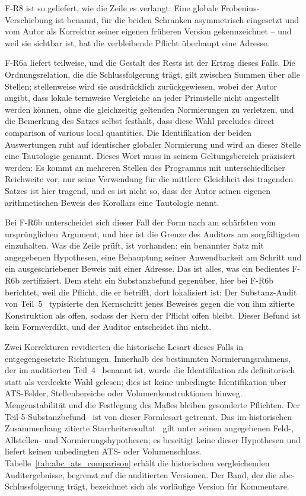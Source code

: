 \documentclass[11pt,a4paper]{article}
\begin{document}
F-R8 ist so geliefert, wie die Zeile es verlangt: Eine globale
Frobenius-Verschiebung ist benannt, für die beiden Schranken asymmetrisch
eingesetzt und vom Autor als Korrektur seiner eigenen früheren Version
gekennzeichnet -- und weil sie sichtbar ist, hat die verbleibende Pflicht
überhaupt eine Adresse.

F-R6a liefert teilweise, und die Gestalt des Rests ist der Ertrag dieses
Falls. Die Ordnungsrelation, die die Schlussfolgerung trägt, gilt zwischen
Summen über alle Stellen; stellenweise wird sie ausdrücklich zurückgewiesen,
wobei der Autor angibt, dass lokale termweise Vergleiche an jeder Primstelle
nicht angestellt werden können, ohne die gleichzeitig geltenden Normierungen
zu verletzen, und die Bemerkung des Satzes selbst festhält, dass diese Wahl
\glqq precludes direct comparison of various local quantities\grqq{}. Die
Identifikation der beiden Auswertungen ruht auf identischer globaler
Normierung und wird an dieser Stelle eine Tautologie genannt. Dieses Wort
muss in seinem Geltungsbereich präzisiert werden: Es kommt an mehreren Stellen des Programms mit
unterschiedlicher Reichweite vor, nur seine Verwendung für die mittlere
Gleichheit des tragenden Satzes ist hier tragend, und es ist nicht so, dass
der Autor seinen eigenen arithmetischen Beweis des Korollars eine Tautologie
nennt.

Bei F-R6b unterscheidet sich dieser Fall der Form nach am schärfsten vom
ursprünglichen Argument, und hier ist die Grenze des Auditors am
sorgfältigsten einzuhalten. Was die Zeile prüft, ist vorhanden: ein benannter
Satz mit angegebenen Hypothesen, eine Behauptung seiner Anwendbarkeit am
Schritt und ein ausgeschriebener Beweis mit einer Adresse. Das ist alles, was
ein bedientes F-R6b zertifiziert. Dem steht ein Substanzbefund gegenüber,
hier bei F-R6b berichtet, weil die Pflicht, die er betrifft, dort lokalisiert
ist: Der Substanz-Audit von Teil~5~\cite{part5} typisierte den Kernschritt
jenes Beweises gegen die von ihm zitierte Konstruktion als offen, sodass der
Kern der Pflicht offen bleibt. Dieser Befund ist kein Formverdikt, und der
Auditor entscheidet ihn nicht.

Zwei Korrekturen revidierten die historische Lesart dieses Falls in
entgegengesetzte Richtungen. Innerhalb des bestimmten Normierungsrahmens,
der im auditierten Teil~4~\cite{part4} benannt ist, wurde die Identifikation
als definitorisch statt als verdeckte Wahl gelesen; dies ist keine
unbedingte Identifikation über ATS-Felder, Stellenbereiche oder
Volumenkonstruktionen hinweg. Mengenstabilität und die Festlegung des
Maßes bleiben gesonderte Pflichten. Der Teil-5-Substanzbefund~\cite{part5}
ist von dieser Formlesart getrennt. Das im historischen Zusammenhang
zitierte Starrheitsresultat~\cite{part6} gilt unter seinen angegebenen
Feld-, Allstellen- und Normierungshypothesen; es beseitigt keine dieser
Hypothesen und liefert keinen unbedingten ATS- oder Volumenschluss.
Tabelle~\ref{tab:abc_ats_comparison} erhält die historischen vergleichenden
Auditergebnisse, begrenzt auf die auditierten Versionen. Der Band, der die
abc-Schlussfolgerung trägt, bezeichnet sich als vorläufige Version für
Kommentare.
\end{document}
